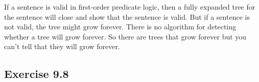 \documentclass{scrartcl}
\begin{document}
%
%
  If a sentence is valid in first-order predicate logic, then a fully expanded
  tree for the sentence will close and show that the sentence is valid. But if a
  sentence is not valid, the tree might grow forever. There is no algorithm for
  detecting whether a tree will grow forever. So there are trees that grow
  forever but you can't tell that they will grow forever.

  \subsection*{Exercise 9.8}

%
%
\end{document}
